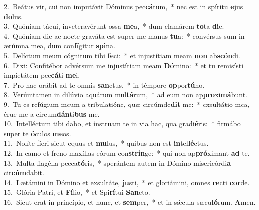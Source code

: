 {2.~}Beátus vir, cui non imputávit Dóminus pec\textbf{cá}tum,~* nec est in spíritu \textbf{e}jus \textbf{do}lus.\\
{3.~}Quóniam tácui, inveteravérunt ossa \textbf{me}a,~* dum clamárem \textbf{to}ta \textbf{di}e.\\
{4.~}Quóniam die ac nocte graváta est super me manus \textbf{tu}a:~* convérsus sum in ærúmna mea, dum con\textbf{fí}gitur \textbf{spi}na.\\
{5.~}Delíctum meum cógnitum tibi \textbf{fe}ci:~* et injustítiam meam \textbf{non} ab\textbf{scón}di.\\
{6.~}Dixi: Confitébor advérsum me injustítiam meam \textbf{Dó}mino:~* et tu remisísti impietátem pec\textbf{cá}ti \textbf{me}i.\\
{7.~}Pro hac orábit ad te omnis \textbf{san}ctus,~* in témpore \textbf{op}por\textbf{tú}no.\\
{8.~}Verúmtamen in dilúvio aquárum mul\textbf{tá}rum,~* ad eum non ap\textbf{pro}xi\textbf{má}bunt.\\
{9.~}Tu es refúgium meum a tribulatióne, quæ circúmde\textbf{dit} me:~* exsultátio mea, érue me a circum\textbf{dán}ti\textbf{bus} me.\\
{10.~}Intelléctum tibi dabo, et ínstruam te in via hac, qua gradi\textbf{é}ris:~* firmábo super te \textbf{ó}culos \textbf{me}os.\\
{11.~}Nolíte fíeri sicut equus et \textbf{mu}lus,~* quibus non est \textbf{in}tel\textbf{lé}ctus.\\
{12.~}In camo et freno maxíllas eórum con\textbf{strín}ge:~* qui non ap\textbf{pró}ximant \textbf{ad} te.\\
{13.~}Multa flagélla pecca\textbf{tó}ris,~* sperántem autem in Dómino misericórdi\textbf{a} cir\textbf{cúm}dabit.\\
{14.~}Lætámini in Dómino et exsultáte, \textbf{ju}sti,~* et gloriámini, omnes \textbf{re}cti \textbf{cor}de.\\
{15.~}Glória Patri, et \textbf{Fí}lio,~* et Spi\textbf{rí}tui \textbf{San}cto.\\
{16.~}Sicut erat in princípio, et nunc, et \textbf{sem}per,~* et in sǽcula sæcu\textbf{ló}rum. \textbf{A}men.\\
